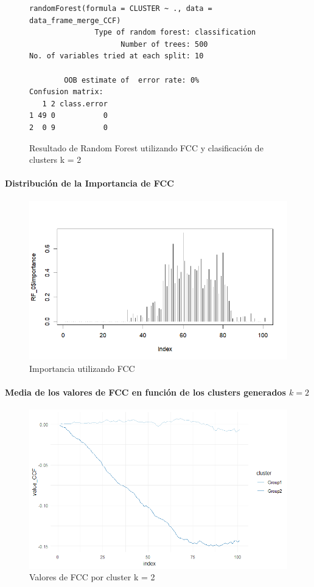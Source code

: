 \begin{figure}[H]
    \centering
    \begin{lstlisting}[frame=single, basicstyle=\small\ttfamily]
        randomForest(formula = CLUSTER ~ ., data = data_frame_merge_CCF) 
               Type of random forest: classification
                     Number of trees: 500
No. of variables tried at each split: 10

        OOB estimate of  error rate: 0%
Confusion matrix:
   1 2 class.error
1 49 0           0
2  0 9           0
    \end{lstlisting}
    \caption{Resultado de Random Forest utilizando FCC y clasificación de clusters k = 2}\label{fig:random_forest_ccf_result_RF_1}
\end{figure}

\paragraph{Distribución de la Importancia de FCC}

\begin{figure}[H]
    \centering
    \includegraphics[scale = 0.8]{img/06-5-ccf.png}
    \caption{Importancia utilizando FCC}
    \label{fig:ccf_imp}
\end{figure}

\paragraph{Media de los valores de FCC en función de los clusters generados $k = 2$}

\begin{figure}[H]
    \centering
    \includegraphics[scale = 0.8]{img/06-6-ccf.png}
    \caption{Valores de FCC por cluster k = 2 }
    \label{fig:ccf_cls}
\end{figure}
